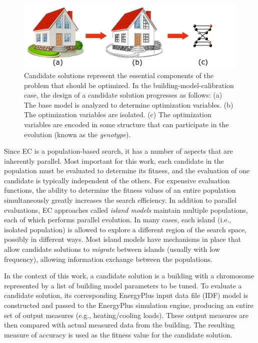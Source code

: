 \documentclass[preprint, review, 12pt]{elsarticle}
\begin{document}
\begin{figure}[htbp]
\centering
\includegraphics[width=5in]{graphics/autotune_chromosome}
\caption{Candidate solutions represent the essential components of the problem that should be optimized. In the building-model-calibration case, the design of a candidate solution progresses as follows: 
(a) The base model is analyzed to determine optimization variables.
(b) The optimization variables are isolated.
(c) The optimization variables are encoded in some structure that can participate in the evolution (known as the \emph{genotype}).}
\label{fig:chromosome}
\end{figure}

Since EC is a population-based search, it has a number of aspects that are inherently parallel. Most important for this work, each candidate in the population must be evaluated to determine its fitness, and the evaluation of one candidate is typically independent of the others. For expensive evaluation functions, the ability to determine the fitness values of an entire population simultaneously greatly increases the search efficiency. In addition to parallel evaluations, EC approaches called \emph{island models} \cite{cit:eiben2007} maintain multiple populations, each of which performs parallel evolution. In many cases, each island (i.e., isolated population) is allowed to explore a different region of the search space, possibly in different ways. Most island models have mechanisms in place that allow candidate solutions to \emph{migrate} between islands (usually with low frequency), allowing information exchange between the populations.

In the context of this work, a candidate solution is a building with a chromosome represented by a list of building model parameters to be tuned. To evaluate a candidate solution, its corresponding EnergyPlus input data file (IDF) model is constructed and passed to the EnergyPlus simulation engine, producing an entire set of output measures (e.g., heating/cooling loads). These output measures are then compared with actual measured data from the building. The resulting measure of accuracy is used as the fitness value for the candidate solution. 
\end{document}
